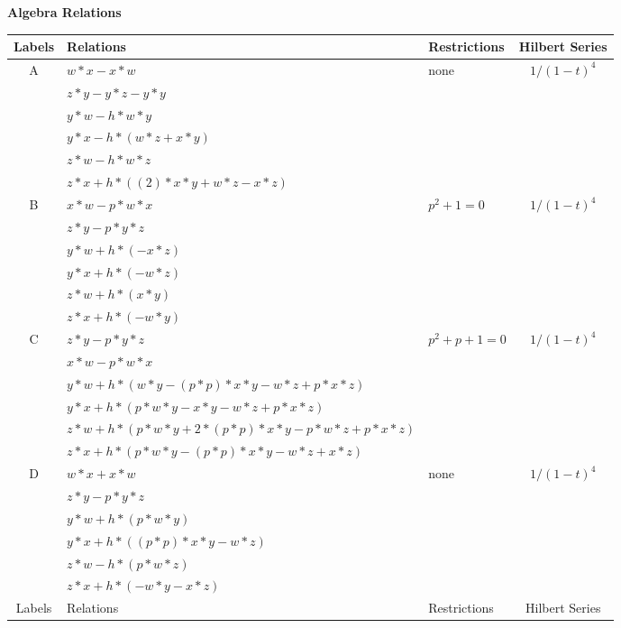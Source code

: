 \documentclass[12]{article}
\begin{document}
\begin{center}
\textbf{\Large{Algebra Relations}}
\end{center}\renewcommand{\arraystretch}{1.35}
\begin{longtable}[c]{|c|p{5.75cm}|p{2.75cm}|c|}
\toprule
 Labels & Relations & Restrictions & Hilbert Series \\ 
\endfirsthead 
  \hline
   A & $ w*x - x*w $ &\multirow{6}{*}{none} &\multirow{6}{*}{$ 1/(1-t)^4 $} \\ 
    & $ z*y - y*z - y*y $ & &  \\ 
   & $ y*w - h*w*y	$ & & \\  
   & $ y*x - h*(w*z + x*y) $ & & \\  
   & $ z*w - h*w*z $ & & \\ 
   & $ z*x + h*((2)*x*y + w*z - x*z) $ & &  \\  
\hline
 B & $ x*w - p*w*x $ &\multirow{6}{*}{$ p^2+1 = 0 $} &\multirow{6}{*}{$ 1/(1-t)^4 $} \\ 
    & $ z*y - p*y*z $ & &  \\ 
   & $ y*w + h*(-x*z) $ & & \\  
   & $ y*x + h*(-w*z) $ & & \\  
   & $  z*w + h*(x*y) $ & & \\ 
   & $ z*x + h*(-w*y) $ & &  \\  
\hline
 C & $  z*y - p*y*z $ &\multirow{6}{*}{$ p^2 + p + 1 = 0 $} &\multirow{6}{*}{$ 1/(1-t)^4 $} \\ 
    & $  x*w - p*w*x $ & &  \\ 
   & $ y*w + h*(w*y - (p*p)*x*y - w*z + p*x*z) $ & & \\  
   & $ y*x + h*(p*w*y - x*y - w*z + p*x*z) $ & & \\  
   & $  z*w + h*(p*w*y + 2*(p*p)*x*y - p*w*z + p*x*z) $ & & \\ 
   & $  z*x + h*(p*w*y - (p*p)*x*y - w*z + x*z) $ & &  \\  
\hline
 D & $ w*x + x*w $ &\multirow{6}{*}{none} &\multirow{6}{*}{$ 1/(1-t)^4 $} \\ 
    & $ z*y - p*y*z $ & &  \\ 
   & $ y*w + h*(p*w*y) $ & & \\  
   & $ y*x + h*((p*p)*x*y - w*z) $ & & \\  
   & $ z*w - h*(p*w*z) $ & & \\ 
   & $ z*x + h*(-w*y - x*z) $ & &  \\  
\hline
\pagebreak
 \midrule[1.0pt]
Labels & Relations & Restrictions & Hilbert Series \\

\end{longtable}
\end{document}
